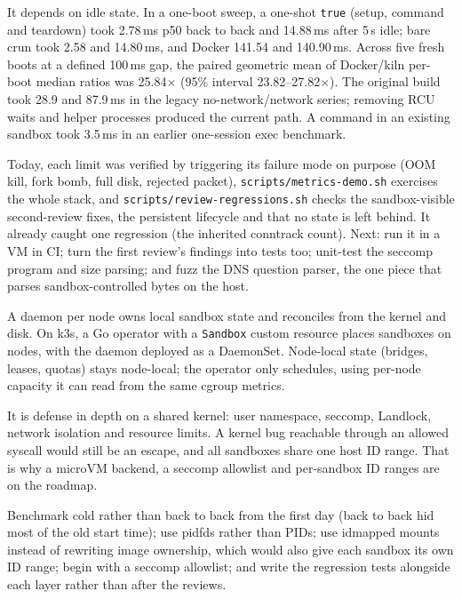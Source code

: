 \documentclass[10pt,letterpaper]{article}
\newcommand{\code}[1]{\texttt{#1}}
\begin{document}
{It depends on idle state. In a one-boot sweep, a one-shot \code{true} (setup,
command and teardown) took 2.78\,ms p50 back to back and 14.88\,ms after 5\,s
idle; bare crun took 2.58 and 14.80\,ms, and Docker 141.54 and 140.90\,ms.
Across five fresh boots at a defined 100\,ms gap, the paired geometric mean of
Docker/kiln per-boot median ratios was 25.84$\times$ (95\% interval
23.82--27.82$\times$). The original
build took 28.9 and 87.9\,ms in the legacy no-network/network series; removing
RCU waits and helper processes produced the current path. A command in an
existing sandbox took 3.5\,ms in an earlier one-session exec benchmark.}

{Today, each limit was verified by triggering its failure mode on purpose (OOM
kill, fork bomb, full disk, rejected packet), \code{scripts/metrics-demo.sh}
exercises the whole stack, and \code{scripts/review-regressions.sh} checks
the sandbox-visible second-review fixes, the persistent lifecycle and that no
state is left behind. It already caught one regression (the inherited
conntrack count). Next:
run it in a VM in CI; turn the first review's findings into tests too; unit-test
the seccomp program and size parsing; and fuzz the DNS question parser, the one
piece that parses sandbox-controlled bytes on the host.}

{A daemon per node owns local sandbox state and reconciles from the kernel and
disk. On k3s, a Go operator with a \code{Sandbox} custom resource places sandboxes
on nodes, with the daemon deployed as a DaemonSet. Node-local state (bridges,
leases, quotas) stays node-local; the operator only schedules, using per-node
capacity it can read from the same cgroup metrics.}

{It is defense in depth on a shared kernel: user namespace, seccomp, Landlock,
network isolation and resource limits. A kernel bug reachable through an allowed
syscall would still be an escape, and all sandboxes share one host ID range.
That is why a microVM backend, a seccomp allowlist and per-sandbox ID ranges are
on the roadmap.}

{Benchmark cold rather than back to back from the first day (back to back hid
most of the old start time); use pidfds rather than PIDs; use idmapped mounts
instead of rewriting image ownership, which would also give each sandbox its
own ID range; begin with a seccomp allowlist; and write the regression tests
alongside each layer rather than after the reviews.}
\end{document}

